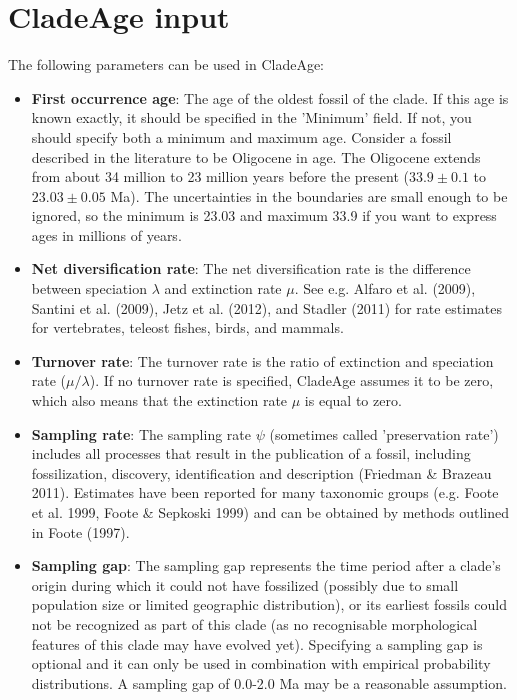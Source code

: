 \documentclass{article}
\begin{document}
\section{CladeAge input}

The following parameters can be used in CladeAge:
\begin{itemize}
\item
{\bf First occurrence age}: The age of the oldest fossil of the clade. If this age is known exactly, it should be specified in the 'Minimum' field. If not, you should specify both a minimum and maximum age. Consider a fossil described in the literature to be Oligocene in age. The Oligocene extends from about 34 million to 23 million years before the present ($33.9\pm 0.1$ to $23.03\pm 0.05$ Ma). The uncertainties in the boundaries are small enough to be ignored, so the minimum is 23.03 and maximum 33.9 if you want to express ages in millions of years. 

\item
	{\bf Net diversification rate}: The net diversification rate is the difference between speciation $\lambda$ and extinction rate $\mu$. 
See e.g. Alfaro et al. (2009), Santini et al. (2009), Jetz et al. (2012), and Stadler (2011) for rate estimates for vertebrates, teleost fishes, birds, and mammals. 

\item
	{\bf Turnover rate}: The turnover rate is the ratio of extinction and speciation rate ($\mu/\lambda$). If no turnover rate is specified, CladeAge assumes it to be zero, which also means that the extinction rate $\mu$ is equal to zero.

\item
	{\bf Sampling rate}: The sampling rate $\psi$ (sometimes called 'preservation rate') includes all processes that result in the publication of a fossil, including fossilization, discovery, identification and description (Friedman \& Brazeau 2011). Estimates have been reported for many taxonomic groups (e.g. Foote et al. 1999, Foote \& Sepkoski 1999) and can be obtained by methods outlined in Foote (1997).

\item
{\bf Sampling gap}: The sampling gap represents the time period after a clade's origin during which it could not have fossilized (possibly due to small population size or limited geographic distribution), or its earliest fossils could not be recognized as part of this clade (as no recognisable morphological features of this clade may have evolved yet). Specifying a sampling gap is optional and it can only be used in combination with empirical probability distributions. A sampling gap of 0.0-2.0 Ma may be a reasonable assumption.
\end{itemize}
\end{document}
